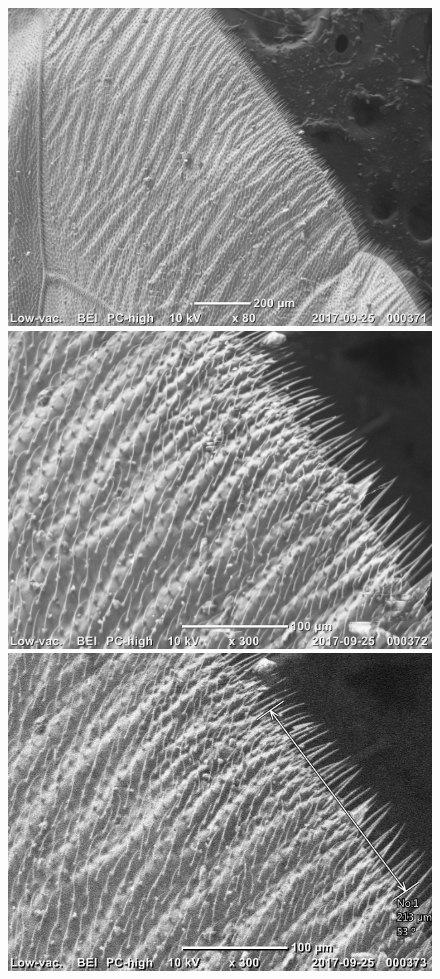 \documentclass[12pt]{article}
\begin{document}
\begin{figure}
	\centering
	\includegraphics[scale=0.65]{pictures/20170925_000371.jpg}
	\includegraphics[scale=0.65]{pictures/20170925_000372.jpg}
	\includegraphics[scale=0.65]{pictures/20170925_000373.jpg}

\end{figure}
\end{document}
